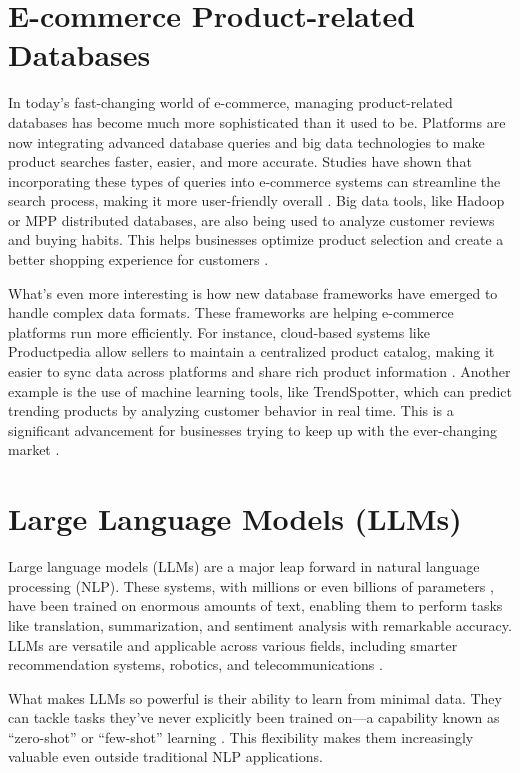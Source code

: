 \section{E-commerce Product-related Databases}

In today's fast-changing world of e-commerce, managing product-related databases has become much more sophisticated than it used to be. Platforms are now integrating advanced database queries and big data technologies to make product searches faster, easier, and more accurate. Studies have shown that incorporating these types of queries into e-commerce systems can streamline the search process, making it more user-friendly overall \cite{Muntjir2016}. Big data tools, like Hadoop or MPP distributed databases, are also being used to analyze customer reviews and buying habits. This helps businesses optimize product selection and create a better shopping experience for customers \cite{Liang_2020}.

What's even more interesting is how new database frameworks have emerged to handle complex data formats. These frameworks are helping e-commerce platforms run more efficiently. For instance, cloud-based systems like Productpedia allow sellers to maintain a centralized product catalog, making it easier to sync data across platforms and share rich product information \cite{10.1007/978-3-319-20895-4_34}. Another example is the use of machine learning tools, like TrendSpotter, which can predict trending products by analyzing customer behavior in real time. This is a significant advancement for businesses trying to keep up with the ever-changing market \cite{10.1145/3583780.3615503}.


\section{Large Language Models (LLMs)} %
Large language models (LLMs) are a major leap forward in natural language processing (NLP). These systems, with millions or even billions of parameters \cite{zhao2023survey}, have been trained on enormous amounts of text, enabling them to perform tasks like translation, summarization, and sentiment analysis with remarkable accuracy. LLMs are versatile and applicable across various fields, including smarter recommendation systems, robotics, and telecommunications \cite{10305960, fan2023fatellm}.

What makes LLMs so powerful is their ability to learn from minimal data. They can tackle tasks they've never explicitly been trained on—a capability known as “zero-shot” or “few-shot” learning \cite{naveed2024comprehensive}. This flexibility makes them increasingly valuable even outside traditional NLP applications.

